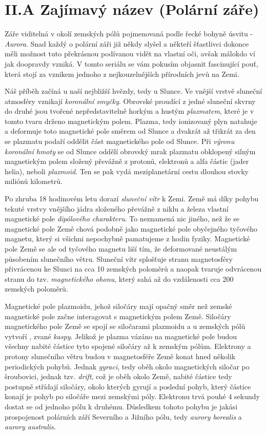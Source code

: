 \documentclass{../../../../style/mkimain}
\begin{document}
\section*{II.A Zajímavý název (Polární záře)}
Záře viditelná v okolí zemských pólů pojmenovaná podle řecké bohyně úsvitu - \emph{Aurora}. 
Snad každý o polární záři již někdy slyšel a někteří šťastlivci dokonce měli možnost 
tuto překrásnou podívanou vidět na vlastní oči, avšak málokdo ví jak doopravdy vzniká. 
V tomto seriálu se vám pokusím objasnit fascinující pouť, která stojí za vznikem jednoho
 z nejkouzelnějších přírodních jevů na Zemi.  

Náš příběh začíná u naší nejbližší hvězdy, tedy u Slunce. Ve vnější vrstvě sluneční atmosféry 
vznikají \emph{koronální smyčky}. Obrovské  proudící z jedné sluneční skvrny do 
druhé jsou tvořené nepředstavitelně horkým a hustým \emph{plazmatem}, které je v tomto tvaru drženo magnetickým polem.
Plazma, tedy ionizovaný plyn natahuje a deformuje toto magnetické pole směrem od Slunce a 
dvakrát až třikrát za den se plazmatu podaří oddělit část magnetického pole od Slunce. 
Při \emph{výronu koronální hmoty} se od Slunce oddělí obrovský mrak plazmatu obklopený silným 
magnetickým polem složený převážně z protonů, elektronů a alfa částic (jader helia), neboli \emph{plazmoid}.
Ten se pak vydá meziplanetární cestu dlouhou stovky miliónů kilometrů. 

Po zhruba 18 hodinovém letu dorazí \emph{sluneční vítr} k Zemi. Země má díky pohybu tekuté vrstvy 
vnějšího jádra složeného převážně z niklu a železa vlastní magnetické pole \emph{dipólového charakteru}.
To neznamená nic jiného, než že se magnetické pole Země chová podobně jako magnetické pole 
obyčejného tyčového magnetu, který si všichni nepochybně pamatujeme z hodin fyziky. Magnetické pole Země
se ale od tyčového magnetu liší tím, že deformované neustálým působením slunečního větru. Sluneční 
vítr splošťuje stranu magnetosféry přivrácenou ke Slunci na cca 10 zemských poloměrů a naopak 
tvaruje odvrácenou stranu do tzv. \emph{magnetického ohonu}, který sahá až do vzdálenosti cca 
200 zemských poloměrů.

Magnetické pole plazmoidu, jehož siločáry mají opačný směr než zemské magnetické pole začne 
interagovat s magnetickým polem Země. Siločáry magnetického pole Země se spojí se siločarami plazmoidu 
a u zemských pólů vytvoří , zvané \emph{kaspy}. Jelikož je plazma vázáno na magnetické pole 
budou všechny nabité částice  tyto spojené siločáry až k zemským pólům. Elektrony 
a protony slunečního větru budou v magnetosféře Země konat hned několik periodických pohybů.
Jednak \emph{gyraci}, tedy oběh okolo magnetických siločar po šroubovici, jednak tzv. \emph{drift}, 
což je oběh okolo Země, nabité částice tedy postupně střídají siločáry, okolo kterých gyrují a 
poslední pohyb, který částice konají je pohyb po siločáře mezi zemskými póly. Elektronu trvá 
pouhé 4 sekundy dostat se od jednoho pólu k druhému. Důsledkem tohoto pohybu je jakási 
prospojenost polárních září Severního a Jižního pólu, tedy \emph{aurory borealis} a \emph{aurory australis}.
\end{document}
